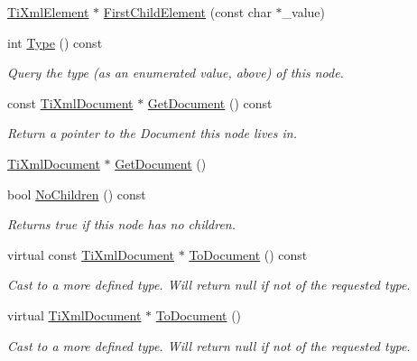 \begin{DoxyCompactItemize}
\hyperlink{classTiXmlElement}{TiXmlElement} $\ast$ \hyperlink{classTiXmlNode_a6936ae323675071808ac4840379e57f5}{FirstChildElement} (const char $\ast$\_\-value)
\item 
int \hyperlink{classTiXmlNode_a57b99d5c97d67a42b9752f5210a1ba5e}{Type} () const 
\begin{DoxyCompactList}\small\item\em Query the type (as an enumerated value, above) of this node. \item\end{DoxyCompactList}\item 
const \hyperlink{classTiXmlDocument}{TiXmlDocument} $\ast$ \hyperlink{classTiXmlNode_aa66f4ebcd175204a168ed7c2d7b43071}{GetDocument} () const 
\begin{DoxyCompactList}\small\item\em Return a pointer to the Document this node lives in. \item\end{DoxyCompactList}\item 
\hyperlink{classTiXmlDocument}{TiXmlDocument} $\ast$ \hyperlink{classTiXmlNode_a7b2372c0e7adfb32f5b6902fe49a39b2}{GetDocument} ()
\item 
bool \hyperlink{classTiXmlNode_aeed21ad30630ef6e7faf096127edc9f3}{NoChildren} () const 
\begin{DoxyCompactList}\small\item\em Returns true if this node has no children. \item\end{DoxyCompactList}\item 
virtual const \hyperlink{classTiXmlDocument}{TiXmlDocument} $\ast$ \hyperlink{classTiXmlNode_a8a4cda4b15c29f64cff419309aebed08}{ToDocument} () const 
\begin{DoxyCompactList}\small\item\em Cast to a more defined type. Will return null if not of the requested type. \item\end{DoxyCompactList}\item 
virtual \hyperlink{classTiXmlDocument}{TiXmlDocument} $\ast$ \hyperlink{classTiXmlNode_a6a4c8ac28ee7a745d059db6691e03bae}{ToDocument} ()
\begin{DoxyCompactList}\small\item\em Cast to a more defined type. Will return null if not of the requested type. \item\end{DoxyCompactList}\item 

\end{DoxyCompactItemize}
